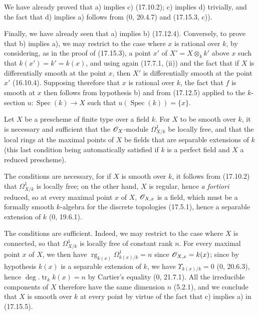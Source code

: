 We have already proved that a) implies c) (17.10.2); c) implies d) trivially, and the fact that d) implies a) follows from (0, 20.4.7) and (17.15.3, c)).

Finally, we have already seen that a) implies b) (17.12.4). Conversely, to prove that b) implies a), we may restrict to the case where $x$ is rational over $k$, by considering, as in the proof of (17.15.3), a point $x'$ of $X'=X\otimes_k k'$ above $x$ such that $k(x')=k'=k(x)$, and using again (17.7.1, (ii)) and the fact that if $X$ is differentially smooth at the point $x$, then $X'$ is differentially smooth at the point $x'$ (16.10.4). Supposing therefore that $x$ is rational over $k$, the fact that $f$ is smooth at $x$ then follows from hypothesis b) and from (17.12.5) applied to the $k$-section $u:\operatorname{Spec}(k)\to X$ such that $u(\operatorname{Spec}(k))=\{x\}$.

\begin{corollary}[17.15.6]
\label{IV.17.15.6}
Let $X$ be a prescheme of finite type over a field $k$. For $X$ to be smooth over $k$, it is necessary and sufficient that the $\mathscr{O}_X$-module $\Omega^1_{X/k}$ be locally free, and that the local rings at the maximal points of $X$ be fields that are separable extensions of $k$ (this last condition being automatically satisfied if $k$ is a perfect field and $X$ a reduced prescheme).
\end{corollary}

The conditions are necessary, for if $X$ is smooth over $k$, it follows from (17.10.2) that $\Omega^1_{X/k}$ is locally free; on the other hand, $X$ is regular, hence \emph{a fortiori} reduced, so at every maximal point $x$ of $X$, $\mathscr{O}_{X,x}$ is a field, which must be a formally smooth $k$-algebra for the discrete topologies (17.5.1), hence a separable extension of $k$ (0, 19.6.1).

The conditions are sufficient. Indeed, we may restrict to the case where $X$ is connected, so that $\Omega^1_{X/k}$ is locally free of constant rank $n$. For every maximal point $x$ of $X$, we then have $\operatorname{rg}_{k(x)}\Omega^1_{k(x)/k}=n$ since $\mathscr{O}_{X,x}=k(x)$; since by hypothesis $k(x)$ is a separable extension of $k$, we have $\Upsilon_{k(x)/k}=0$ (0, 20.6.3), hence $\deg.\operatorname{tr}_k k(x)=n$ by Cartier's equality (0, 21.7.1). All the irreducible components of $X$ therefore have the same dimension $n$ (5.2.1), and we conclude that $X$ is smooth over $k$ at every point by virtue of the fact that c) implies a) in (17.15.5).

